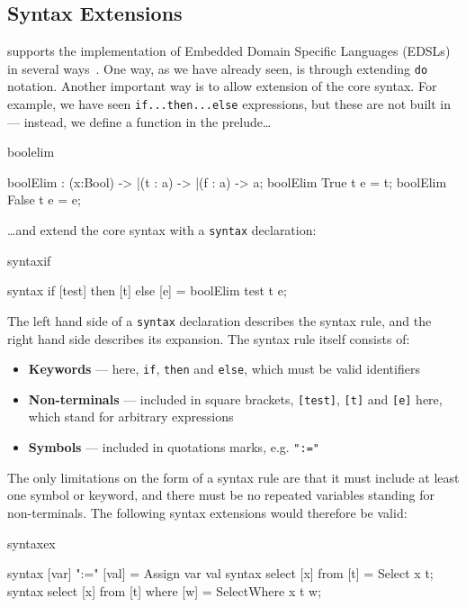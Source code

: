 \subsection{Syntax Extensions}

\Idris{} supports the implementation of Embedded Domain Specific Languages (EDSLs) in
several ways~\cite{res-dsl-padl12}. One way, as we have already seen, is through
extending \texttt{do} notation. Another important way is to allow extension of the core
syntax. For example, we have seen \texttt{if...then...else} expressions, but these
are not built in --- instead, we define a function in the prelude\ldots

\begin{SaveVerbatim}{boolelim}

boolElim : (x:Bool) -> |(t : a) -> |(f : a) -> a; 
boolElim True  t e = t;
boolElim False t e = e;

\end{SaveVerbatim}

\noindent
\ldots and extend the core syntax with a \texttt{syntax} declaration:

\begin{SaveVerbatim}{syntaxif}

syntax if [test] then [t] else [e] = boolElim test t e;

\end{SaveVerbatim}

\noindent
The left hand side of a \texttt{syntax} declaration describes the syntax rule, and the right
hand side describes its expansion. The syntax rule itself consists of:

\begin{itemize}
\item \textbf{Keywords} --- here, \texttt{if}, \texttt{then} and \texttt{else}, which must
be valid identifiers
\item \textbf{Non-terminals} --- included in square brackets, \texttt{[test]}, \texttt{[t]}
and \texttt{[e]} here, which stand for arbitrary expressions
\item \textbf{Symbols} --- included in quotations marks, e.g. \texttt{":="}
\end{itemize}

\noindent
The only limitations on the form of a syntax rule are that it must include at least one
symbol or keyword, and there must be no repeated variables standing for non-terminals.
The following syntax extensions would therefore be valid:

\begin{SaveVerbatim}{syntaxex}

syntax [var] ":=" [val]              = Assign var val
syntax select [x] from [t]           = Select x t;
syntax select [x] from [t] where [w] = SelectWhere x t w;

\end{SaveVerbatim}

